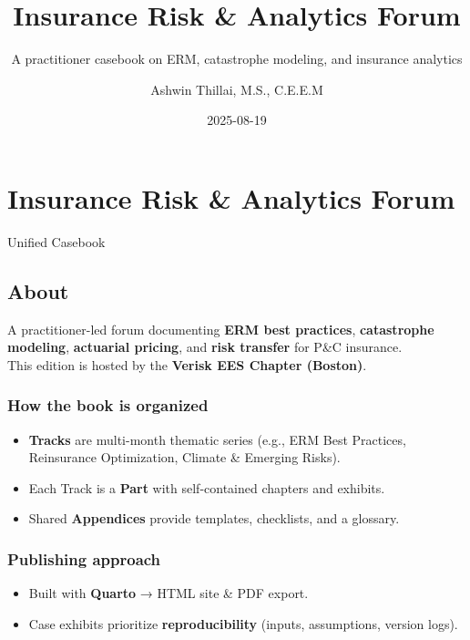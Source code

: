 \documentclass[
  letterpaper,
]{scrbook}
\title{Insurance Risk \& Analytics Forum}
\subtitle{A practitioner casebook on ERM, catastrophe modeling, and
insurance analytics}
\author{Ashwin Thillai, M.S., C.E.E.M}
\date{2025-08-19}
\providecommand{\tightlist}{%
  \setlength{\itemsep}{0pt}\setlength{\parskip}{0pt}}\usepackage{longtable,booktabs,array}
\renewcommand*\contentsname{Table of contents}
\newcommand\contentsname{Table of contents}
\begin{document}
\frontmatter
\maketitle

\renewcommand*\contentsname{Table of contents}
{
\setcounter{tocdepth}{2}
\tableofcontents
}

\mainmatter
{}

\chapter{Insurance Risk \& Analytics
Forum}\label{insurance-risk-analytics-forum}

Unified Casebook

\hfill\break

\section{About}\label{about}

A practitioner-led forum documenting \textbf{ERM best practices},
\textbf{catastrophe modeling}, \textbf{actuarial pricing}, and
\textbf{risk transfer} for P\&C insurance.\\
This edition is hosted by the \textbf{Verisk EES Chapter (Boston)}.

\subsection{How the book is organized}\label{how-the-book-is-organized}

\begin{itemize}
\tightlist
\item
  \textbf{Tracks} are multi-month thematic series (e.g., ERM Best
  Practices, Reinsurance Optimization, Climate \& Emerging Risks).
\item
  Each Track is a \textbf{Part} with self-contained chapters and
  exhibits.
\item
  Shared \textbf{Appendices} provide templates, checklists, and a
  glossary.
\end{itemize}

\subsection{Publishing approach}\label{publishing-approach}

\begin{itemize}
\tightlist
\item
  Built with \textbf{Quarto} → HTML site \& PDF export.
\item
  Case exhibits prioritize \textbf{reproducibility} (inputs,
  assumptions, version logs).
\end{itemize}
\end{document}
